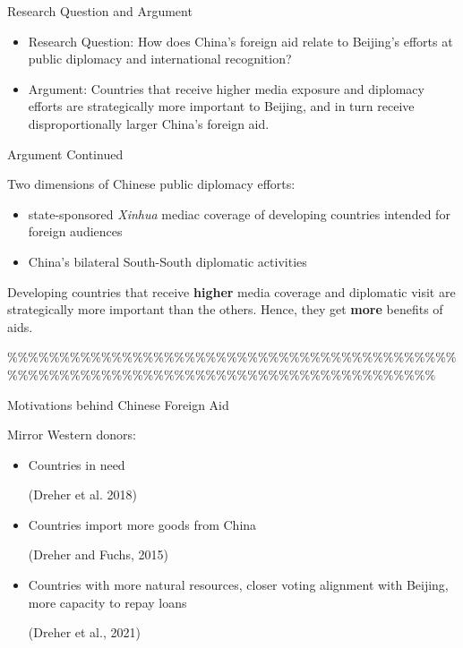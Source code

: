 \documentclass[
  ignorenonframetext,
]{beamer}
\begin{document}
\begin{frame}
\begin{frame}{Research Question and Argument}

\begin{itemize}
    \item Research Question: How does China’s foreign aid relate to Beijing’s efforts at public diplomacy and international recognition?

   \item Argument: Countries that receive higher media exposure and diplomacy efforts are
strategically more important to Beijing, and in turn receive disproportionally larger China’s
foreign aid.

\end{itemize}
\end{frame}

\begin{frame}{Argument Continued}

Two dimensions of Chinese public diplomacy efforts:

\begin{itemize}
    \item state-sponsored \textit{Xinhua} mediac coverage of developing countries intended for foreign audiences
    \item China’s bilateral South-South diplomatic activities

\end{itemize}


Developing countries that receive \textbf{higher} media coverage and diplomatic visit are strategically more important than the others. Hence, they get \textbf{more} benefits of aids.
    

\end{frame}

\%\%\%\%\%\%\%\%\%\%\%\%\%\%\%\%\%\%\%\%\%\%\%\%\%\%\%\%\%\%\%\%\%\%\%\%\%\%\%\%\%\%\%\%\%\%\%\%\%\%\%\%\%\%\%\%\%\%\%\%\%\%\%\%\%\%\%\%\%\%\%\%\%\%\%\%\%\%\%\%\%\%\%\%

\begin{frame}{Motivations behind Chinese Foreign Aid}


Mirror Western donors:

\begin{itemize}
    \item Countries in need \begin{footnotesize} (Dreher et al. 2018) \end{footnotesize}
    \item Countries import more goods from China \begin{footnotesize} (Dreher and Fuchs, 2015) \end{footnotesize}
    \item Countries with more natural resources, closer voting alignment with Beijing, more capacity to repay loans \begin{footnotesize} (Dreher et al., 2021) \end{footnotesize}
\end{itemize}


\end{frame}
\end{frame}
\end{document}
